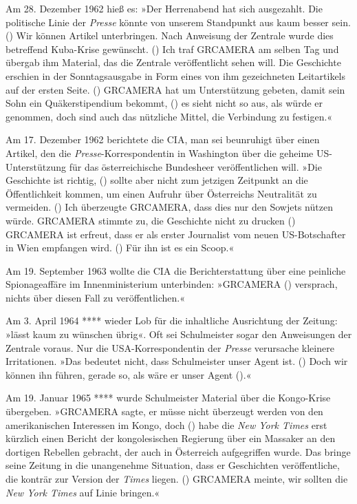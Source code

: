Am 28. Dezember 1962 hieß es: »Der Herrenabend hat sich ausgezahlt. Die
politische Linie der \emph{Presse} könnte von unserem Standpunkt aus
kaum besser sein. () Wir können Artikel unter­bringen. Nach Anweisung
der Zentrale wurde dies betreffend Kuba-Krise gewünscht. () Ich traf
GRCAMERA am selben Tag und übergab ihm Material, das die Zentrale
veröffentlicht sehen will. Die Geschichte erschien in der
Sonntags­ausgabe in Form eines von ihm gezeichneten Leitartikels auf der
ersten Seite. () GRCAMERA hat um Unterstützung ­gebeten, damit sein Sohn
ein Quäker­stipendium bekommt, () es sieht nicht so aus, als würde er
genommen, doch sind auch das nützliche Mittel, die Verbindung zu
festigen.«

Am 17. Dezember 1962 berichtete die CIA, man sei beunruhigt über einen
Artikel, den die \emph{Presse}-Korrespondentin in Washington über die
geheime US-Unterstützung für das österreichische Bundes­heer
veröffentlichen will. »Die Geschichte ist richtig, () sollte aber nicht
zum jetzigen Zeitpunkt an die Öffentlichkeit kommen, um einen Aufruhr
über Österreichs Neutralität zu vermeiden. () Ich überzeugte GRCAMERA,
dass dies nur den Sowjets nützen würde. GRCAMERA stimmte zu, die
Geschichte nicht zu drucken () GRCAMERA ist erfreut, dass er als erster
Journalist vom neuen US-Botschafter in Wien empfangen wird. () Für ihn
ist es ein Scoop.«

Am 19. September 1963 wollte die CIA die Bericht­erstattung über eine
peinliche Spionage­affäre im Innen­ministerium unterbinden: »GRCAMERA ()
versprach, nichts über diesen Fall zu veröffent­lichen.«

Am 3. April 1964 **** wieder Lob für die inhaltliche Ausrichtung der
Zeitung: »lässt kaum zu wünschen übrig«. Oft sei Schulmeister sogar den
Anweisungen der Zentrale voraus. Nur die USA-Korrespondentin der
\emph{Presse} verursache kleinere Irritationen. »Das bedeutet nicht,
dass Schulmeister unser Agent ist. () Doch wir können ihn führen, gerade
so, als wäre er unser Agent ().«

Am 19. Januar 1965 **** wurde Schulmeister ­Material über die
Kongo-Krise übergeben. »GRCAMERA sagte, er müsse nicht überzeugt werden
von den amerikanischen Interessen im Kongo, doch () habe die \emph{New
York Times} erst kürzlich einen Bericht der kongolesischen Regierung
über ein Massa­ker an den dortigen Rebellen gebracht, der auch in
Österreich aufgegriffen wurde. Das bringe seine Zeitung in die
unangenehme Situation, dass er Geschichten veröffentliche, die konträr
zur Version der \emph{Times} liegen. () GRCAMERA meinte, wir sollten die
\emph{New York Times} auf Linie bringen.«

